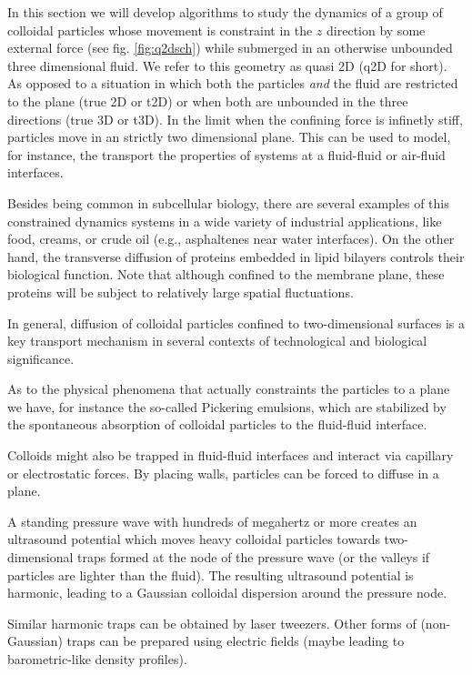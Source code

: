 \documentclass[ twoside,openright,titlepage,numbers=noenddot,%
headinclude,footinclude,cleardoublepage=empty,abstract=on,
BCOR=5mm,paper=a4,fontsize=11pt, dvipsnames
]{scrreprt}
\begin{document}
In this section we will develop algorithms to study the dynamics of a group of colloidal particles whose movement is constraint in the $z$ direction by some external force (see fig. \ref{fig:q2dsch}) while submerged in an otherwise unbounded three dimensional fluid. We refer to this geometry as quasi 2D (q2D for short). As opposed to a situation in which both the particles \emph{and} the fluid are restricted to the plane (true 2D or t2D) or when both are unbounded in the three directions (true 3D or t3D). In the limit when the confining force is infinetly stiff, particles move in an strictly two dimensional plane. This can be used to model, for instance, the transport the properties of systems at a fluid-fluid or air-fluid interfaces. 

Besides being common in subcellular biology, there are several examples of this constrained dynamics systems in a wide variety of industrial applications, like food, creams, or crude oil (e.g., asphaltenes near water interfaces).
On the other hand, the transverse diffusion of proteins embedded in lipid bilayers controls their biological function\cite{Brown20112}.
Note that although confined to the membrane plane, these proteins will be subject to relatively large spatial fluctuations.

In general, diffusion of colloidal particles confined to two-dimensional surfaces is a key transport mechanism in several contexts of technological and biological significance.

As to the physical phenomena that actually constraints the particles to a plane we have, for instance the so-called Pickering emulsions, which are stabilized by the spontaneous absorption of colloidal particles to the fluid-fluid interface.

Colloids might also be trapped in fluid-fluid interfaces and interact via capillary\cite{Dominguez2010} or electrostatic\cite{Gao2016} forces. By placing walls, particles can be forced to diffuse in a plane\cite{Lin2014}. 

A standing pressure wave with hundreds of megahertz or more creates an ultrasound potential which moves heavy colloidal particles towards two-dimensional traps formed at the node of the pressure wave (or the valleys if particles are lighter than the fluid)\cite{Settnes2012,Balboa2013}. The resulting ultrasound potential is harmonic, leading to a Gaussian colloidal dispersion around the pressure node\cite{Balboa2013}.

Similar harmonic traps can be obtained by laser tweezers\cite{Ding2012}. Other forms of (non-Gaussian) traps can be prepared using electric fields (maybe leading to barometric-like density profiles).
\end{document}
